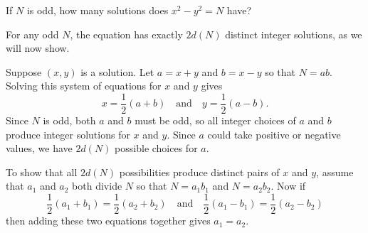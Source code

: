  If $N$ is odd, how many solutions does $x^2 - y^2 = N$
have?
\begin{solution}
  For any odd $N$, the equation has exactly $2d(N)$ distinct integer
  solutions, as we will now show.

  Suppose $(x,y)$ is a solution. Let $a = x + y$ and $b = x - y$ so
  that $N = ab$. Solving this system of equations for $x$ and $y$
  gives
  \begin{equation*}
    x = \frac12(a + b) \quad\text{and}\quad y = \frac12(a - b).
  \end{equation*}
  Since $N$ is odd, both $a$ and $b$ must be odd, so all integer
  choices of $a$ and $b$ produce integer solutions for $x$ and
  $y$. Since $a$ could take positive or negative values, we have
  $2d(N)$ possible choices for $a$.

  To show that all $2d(N)$ possibilities produce distinct pairs of $x$
  and $y$, assume that $a_1$ and $a_2$ both divide $N$ so that
  $N = a_1b_1$ and $N = a_2b_2$. Now if
  \begin{equation*}
    \frac12(a_1 + b_1) = \frac12(a_2 + b_2)
    \quad\text{and}\quad
    \frac12(a_1 - b_1) = \frac12(a_2 - b_2)
  \end{equation*}
  then adding these two equations together gives $a_1 = a_2$.
\end{solution}

